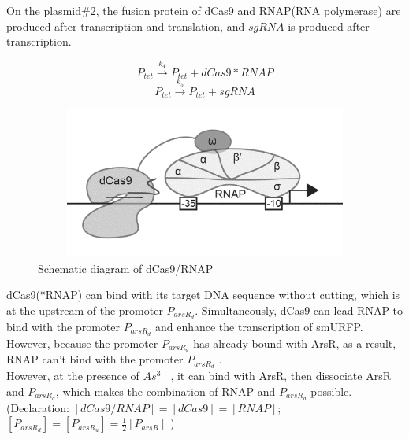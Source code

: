 On the plasmid\#2, the fusion protein of dCas9 and RNAP(RNA polymerase) are produced after transcription and translation, and $sgRNA$ is produced after transcription.

\begin{equation}
P_{tet} \stackrel{k_{4}}{\longrightarrow} P_{tet} +dCas9*RNAP
\end{equation}
\begin{equation}
P_{tet} \stackrel{k_{5}}{\longrightarrow} P_{tet} +sgRNA
\end{equation}

\begin{figure}[h]
	\centering
	\includegraphics[width=12cm,height=5cm]{2}
	\caption{Schematic diagram of dCas9/RNAP}
\end{figure}

dCas9(*RNAP) can bind with its target DNA sequence without cutting, which is at the upstream of the promoter $P_{arsR_d}$. Simultaneously, dCas9 can lead RNAP to bind with the promoter $P_{arsR_d}$ and enhance the transcription of smURFP. However, because the promoter $P_{arsR_d}$ has already bound with ArsR, as a result, RNAP can't bind with the promoter $P_{arsR_d}$ . \\ 

However, at the presence of $As^{3+}$, it can bind with ArsR, then dissociate ArsR and $P_{arsR_d}$, which makes the combination of RNAP and $P_{arsR_d}$ possible. \\

(Declaration: $[dCas9/RNAP] = [dCas9] = [RNAP]$;\\ $[P_{arsR_d}]=[P_{arsR_u}] = \frac{1}{2}[P_{arsR}]$ )

